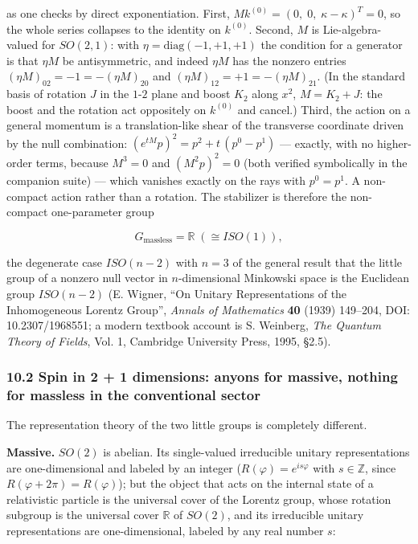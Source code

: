 \documentclass[
]{article}
\begin{document}
as one checks by direct exponentiation. First,
\(M k^{(0)} = (0,\; 0,\; \kappa - \kappa)^{T} = 0\), so the whole series
collapses to the identity on \(k^{(0)}\). Second, \(M\) is
Lie-algebra-valued for \(SO(2,1)\): with
\(\eta = \mathrm{diag}(-1,+1,+1)\) the condition for a generator is that
\(\eta M\) be antisymmetric, and indeed \(\eta M\) has the nonzero
entries \((\eta M)_{02} = -1 = -(\eta M)_{20}\) and
\((\eta M)_{12} = +1 = -(\eta M)_{21}\). (In the standard basis of
rotation \(J\) in the \(1\)-\(2\) plane and boost \(K_{2}\) along
\(x^{2}\), \(M = K_{2} + J\): the boost and the rotation act oppositely
on \(k^{(0)}\) and cancel.) Third, the action on a general momentum is a
translation-like shear of the transverse coordinate driven by the null
combination: \((e^{tM} p)^{2} = p^{2} + t\,(p^{0} - p^{1})\) ---
exactly, with no higher-order terms, because \(M^{3} = 0\) and
\((M^{2} p)^{2} = 0\) (both verified symbolically in the companion
suite) --- which vanishes exactly on the rays with \(p^{0} = p^{1}\). A
non-compact action rather than a rotation. The stabilizer is therefore
the non-compact one-parameter group

\[G_{\mathrm{massless}} = \mathbb{R} \; (\cong ISO(1)), \tag{72}\]

the degenerate case \(ISO(n-2)\) with \(n = 3\) of the general result
that the little group of a nonzero null vector in \(n\)-dimensional
Minkowski space is the Euclidean group \(ISO(n-2)\) (E. Wigner, ``On
Unitary Representations of the Inhomogeneous Lorentz Group'',
\emph{Annals of Mathematics} \textbf{40} (1939) 149--204, DOI:
10.2307/1968551; a modern textbook account is S. Weinberg, \emph{The
Quantum Theory of Fields}, Vol. 1, Cambridge University Press, 1995,
§2.5).

\hypertarget{spin-in-2-1-dimensions-anyons-for-massive-nothing-for-massless-in-the-conventional-sector}{%
\subsubsection{10.2 Spin in 2 + 1 dimensions: anyons for massive,
nothing for massless in the conventional
sector}\label{spin-in-2-1-dimensions-anyons-for-massive-nothing-for-massless-in-the-conventional-sector}}

The representation theory of the two little groups is completely
different.

\textbf{Massive.} \(SO(2)\) is abelian. Its single-valued irreducible
unitary representations are one-dimensional and labeled by an integer
(\(R(\varphi) = e^{i s \varphi}\) with \(s \in \mathbb{Z}\), since
\(R(\varphi + 2\pi) = R(\varphi)\)); but the object that acts on the
internal state of a relativistic particle is the universal cover of the
Lorentz group, whose rotation subgroup is the universal cover
\(\mathbb{R}\) of \(SO(2)\), and its irreducible unitary representations
are one-dimensional, labeled by any real number \(s\):
\end{document}

